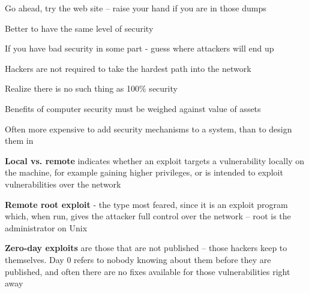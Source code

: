 \documentclass[Screen16to9,17pt]{foils}
\begin{document}
\centerline{Go ahead, try the web site -- raise your hand if you are in those dumps}





\begin{list1}
\item Better to have the same level of security
\item If you have bad security in some part - guess where attackers will end up
\item Hackers are not required to take the hardest path into the network
\item Realize there is no such thing as 100\% security
\end{list1}


\begin{list1}
\item Benefits of computer security must be weighed against value of assets
\item Often more expensive to add security mechanisms to a system, than to design them in
\end{list1}


\begin{list1}
\item {\bfseries Local vs. remote}
indicates whether an exploit targets
a vulnerability locally on the machine, for example
gaining higher privileges, or is intended
to exploit vulnerabilities over the network
\item {\bfseries Remote root exploit}
- the type most feared, since
it is an exploit program which, when run, gives
the attacker full control over the network -- root is the administrator
on Unix
\item {\bfseries Zero-day exploits} are those that are not published -- those
  hackers keep to themselves. Day 0 refers to nobody knowing
  about them before they are published, and often there are no fixes
  available for those vulnerabilities right away
\end{list1}

\end{document}
